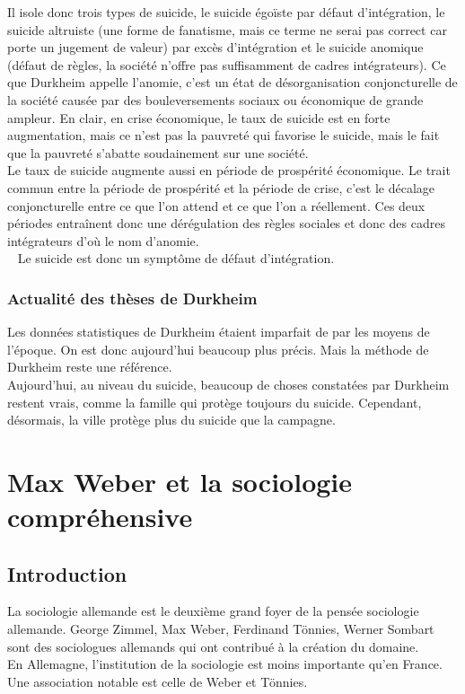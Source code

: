 \documentclass[10pt, a4paper, openany]{book}
\begin{document}
Il isole donc trois types de suicide, le suicide égoïste par défaut d'intégration, le suicide altruiste (une forme de fanatisme, mais ce terme ne serai pas correct car porte un jugement de valeur) par excès d'intégration et le suicide anomique (défaut de règles, la société n'offre pas suffisamment de cadres intégrateurs). Ce que Durkheim appelle l'anomie, c'est un état de désorganisation conjoncturelle de la société causée par des bouleversements sociaux ou économique de grande ampleur. En clair, en crise économique, le taux de suicide est en forte augmentation, mais ce n'est pas la pauvreté qui favorise le suicide, mais le fait que la pauvreté s'abatte soudainement sur une société. \\
Le taux de suicide augmente aussi en période de prospérité économique. Le trait commun entre la période de prospérité et la période de crise, c'est le décalage conjoncturelle entre ce que l'on attend et ce que l'on a réellement. Ces deux périodes entraînent donc une dérégulation des règles sociales et donc des cadres intégrateurs d'où le nom d'anomie. \\ 
Le suicide est donc un symptôme de défaut d'intégration.


\subsection{Actualité des thèses de Durkheim}

Les données statistiques de Durkheim étaient imparfait de par les moyens de l'époque. On est donc aujourd'hui beaucoup plus précis. Mais la méthode de Durkheim reste une référence. \\
Aujourd'hui, au niveau du suicide, beaucoup de choses constatées par Durkheim restent vrais, comme la famille qui protège toujours du suicide. Cependant, désormais, la ville protège plus du suicide que la campagne.

\chapter{Max Weber et la sociologie compréhensive}

\section{Introduction}

La sociologie allemande est le deuxième grand foyer de la pensée sociologie allemande. George Zimmel, Max Weber, Ferdinand Tönnies, Werner Sombart sont des sociologues allemands qui ont contribué à la création du domaine. \\
En Allemagne, l'institution de la sociologie est moins importante qu'en France. Une association notable est celle de Weber et Tönnies.
\end{document}
